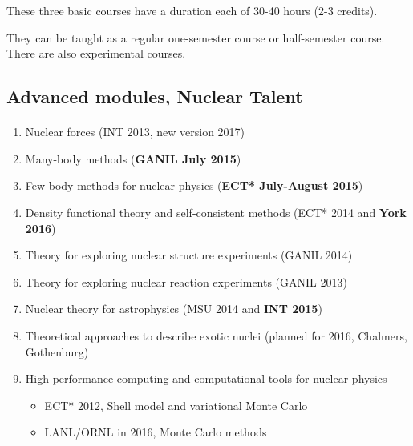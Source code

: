 \documentclass[%
twoside,                 %
final,                   %
10pt]{article}
\begin{document}
\noindent
These three basic courses have a duration each  of 30-40 hours (2-3 credits).   

They can be taught as a regular one-semester course or half-semester course. There are also experimental courses.








\subsection{Advanced  modules, Nuclear Talent}

\paragraph{}
\begin{enumerate}
\item Nuclear forces (INT 2013, new version 2017)

\item Many-body methods (\textbf{GANIL July 2015})

\item Few-body methods for nuclear physics (\textbf{ECT* July-August 2015})

\item Density functional theory and self-consistent methods (ECT* 2014 and \textbf{York 2016})

\item Theory for exploring nuclear structure experiments (GANIL 2014)

\item Theory for exploring nuclear reaction experiments (GANIL 2013)

\item Nuclear theory for astrophysics (MSU 2014 and \textbf{INT 2015})

\item Theoretical approaches to describe  exotic nuclei (planned for 2016, Chalmers, Gothenburg)

\item High-performance computing and computational tools for nuclear physics
\begin{itemize}

  \item ECT* 2012, Shell model and variational Monte Carlo

  \item LANL/ORNL in 2016, Monte Carlo methods 
\end{itemize}

\noindent
\end{enumerate}
\end{document}
